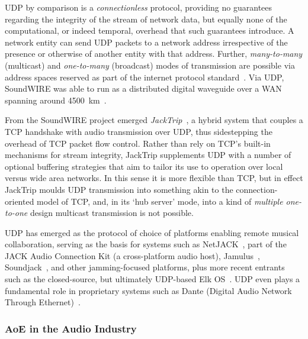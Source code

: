 UDP by comparison is a \textit{connectionless} protocol, providing no guarantees
regarding the integrity of the stream of network data, but equally none of the
computational, or indeed temporal, overhead that such guarantees introduce.
A network entity can send UDP packets to a network address irrespective of
the presence or otherwise of another entity with that address.
Further, \textit{many-to-many} (multicast) and \textit{one-to-many} (broadcast)
modes of transmission are possible via address spaces reserved as part of the
internet protocol standard~\citep{meyer_iana_2010}.
Via UDP, SoundWIRE was able to run as a distributed digital waveguide over a
WAN spanning around \qty{4500}{\km}~\citep{chafe_simplified_2000}.

From the SoundWIRE project emerged
\textit{JackTrip}~\citep{caceres_jacktrip_2010,caceras_jacktripsoundwire_2010},
a hybrid system that couples a TCP handshake with audio transmission over UDP,
thus sidestepping the overhead of TCP packet flow control.
Rather than rely on TCP's built-in mechanisms for stream integrity, JackTrip
supplements UDP with a number of optional buffering strategies that aim to
tailor its use to operation over local versus wide area networks.
In this sense it is more flexible than TCP, but in effect JackTrip moulds UDP
transmission into something akin to the connection-oriented model of TCP, and,
in its `hub server' mode, into a kind of \textit{multiple one-to-one} design
\textemdash{} multicast transmission is not possible.

UDP has emerged as the protocol of choice of platforms enabling remote musical
collaboration, serving as the basis for systems such as
NetJACK~\citep{carot_netjack_2009}, part of the JACK Audio Connection Kit (a
cross-platform audio host), Jamulus~\citep{fischer_case_2015},
Soundjack~\citep{renaud_networked_2012}, and other jamming-focused platforms,
plus more recent entrants such as the closed-source, but ultimately UDP-based
Elk OS~\citep{turchet_elk_2021}.
UDP even plays a fundamental role in proprietary systems such as Dante (Digital
Audio Network Through Ethernet)~\citep{noauthor_what_nodate}.

\subsubsection{AoE in the Audio Industry}

